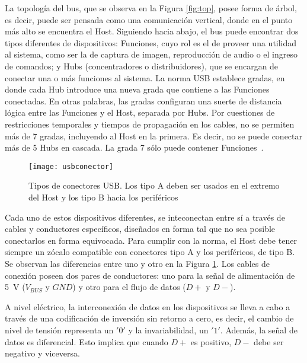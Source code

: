 La topología del bus, que se observa en la Figura \ref{fig:top}, posee forma de árbol, es decir, puede ser pensada como una comunicación vertical, donde en el punto más alto se encuentra el Host. Siguiendo hacia abajo, el bus puede encontrar dos tipos diferentes de dispositivos: Funciones, cuyo rol es el de proveer una utilidad al sistema, como ser la de captura de imagen, reproducción de audio o el ingreso de comandos; y Hubs (concentradores o distribuidores), que se encargan de conectar una o más funciones al sistema. La norma USB establece gradas, en donde cada Hub introduce una nueva grada que contiene a las Funciones conectadas. En otras palabras, las gradas configuran una suerte de distancia lógica entre las Funciones y el Host, separada por Hubs. Por cuestiones de restricciones temporales y tiempos de propagación en los cables, no se permiten más de 7 gradas, incluyendo al Host en la primera. Es decir, no se puede conectar más de 5 Hubs en cascada. La grada 7 sólo puede contener Funciones~\cite{USBspec}.%

\begin{figure}[hb]
	\centering
	\texttt{[image: usbconector]}
	\caption{Tipos de conectores USB. Los tipo A deben ser usados en el extremo del Host y los tipo B hacia los periféricos~\cite{USBHardwareWiki}}
	\label{fig:con}
\end{figure}

Cada uno de estos dispositivos diferentes, se inteconectan entre sí a través de cables y conductores específicos, diseñados en forma tal que no sea posible conectarlos en forma equivocada. Para cumplir con la norma, el Host debe tener siempre un zócalo compatible con conectores tipo A y los periféricos, de tipo B. Se observan las diferencias entre uno y otro en la Figura \ref{fig:con}. Los cables de conexión poseen dos pares de conductores: uno para la señal de alimentación de \SI{5}{\volt} ($V_{BUS}$ y $GND$) y otro para el flujo de datos ($D+$ y $D-$).%

A nivel eléctrico, la interconexión de datos en los dispositivos se lleva a cabo a través de una codificación de inversión sin retorno a cero, es decir, el cambio de nivel de tensión representa un $'0'$ y la invariabilidad, un $'1'$. Además, la señal de datos es diferencial. Esto implica que cuando $D+$ es positivo, $D-$ debe ser negativo y viceversa.%

